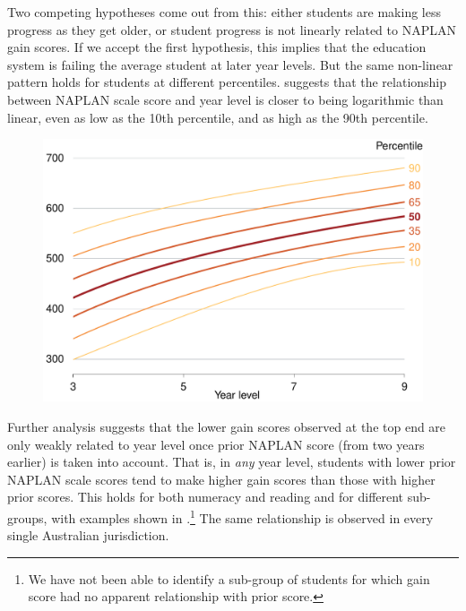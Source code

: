 Two competing hypotheses come out from this: either students are making less progress as they get older, or student progress is not linearly related to NAPLAN gain scores. If we accept the first hypothesis, this implies that the education system is failing the average student at later year levels. But the same non-linear pattern holds for students at different percentiles.  suggests that the relationship between NAPLAN scale score and year level is closer to being logarithmic than linear, even as low as the 10th percentile, and as high as the 90th percentile.

\begin{figure}[t]
 \includegraphics[width=\columnwidth]{atlas/Percentiles_R.pdf}\label{fig:percentiles}

\end{figure}

Further analysis suggests that the lower gain scores observed at the top end are only weakly related to year level once prior NAPLAN score (from two years earlier) is taken into account. That is, in \textit{any} year level, students with lower prior NAPLAN scale scores tend to make higher gain scores than those with higher prior scores. This holds for both numeracy and reading and for different sub-groups, with examples shown in .\footnote{We have not been able to identify a sub-group of students for which gain score had no apparent relationship with prior score.} The same relationship is observed in every single Australian jurisdiction. 

